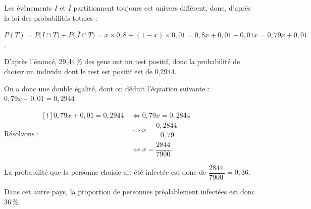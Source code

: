 \documentclass[10pt]{article}
\providecommand{\np}[2][]{{#2~#1}}
\begin{document}
	Les évènements $I$ et $\overline{I}$ partitionnent toujours cet univers différent, donc, d'après la loi des probabilités totales :

$P(T) = P\big(I\cap T\big) + P\big(~\overline{I} \cap T\big) = x \times 0,8 + (1 - x) \times 0,01 = 0,8x + 0,01 - 0,01x = 0,79x + 0,01$.

D'après l'énoncé, 29,44\,\% des gens ont un test positif, donc la probabilité de choisir un individu dont le test est positif est de 0,2944.

On a donc une double égalité, dont on déduit l'équation suivante : \quad $0,79x + 0,01 = 0,2944$

Résolvons :\quad $\begin{aligned}[t] 0,79x + 0,01 = \np{0,2944}&\iff 0,79x = \np{0,2844}\\
&\iff x = \dfrac{\np{0,2844}}{0,79}\\
&\iff x = \dfrac{\np{2844}}{\np{7900}}\end{aligned}$

La probabilité que la personne choisie ait été infectée est donc de $\dfrac{\np{2844}}{\np{7900}} = 0,36$.

Dans cet autre pays, la proportion de personnes préalablement infectées est donc 36\,\%.

\bigskip
\end{document}
